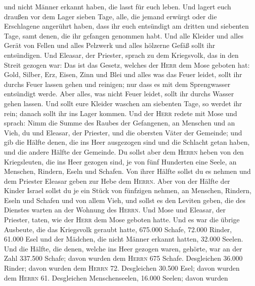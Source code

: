 und nicht Männer erkannt haben, die lasst für euch leben.
 Und lagert euch draußen vor dem Lager sieben Tage, alle,
die jemand erwürgt oder die Erschlagene angerührt haben, dass ihr euch
entsündigt am dritten und siebenten Tage, samt denen, die ihr gefangen
genommen habt.  Und alle Kleider und alles Gerät von
Fellen und alles Pelzwerk und alles hölzerne Gefäß sollt ihr
entsündigen.  Und Eleasar, der Priester, sprach zu dem
Kriegsvolk, das in den Streit gezogen war: Das ist das Gesetz, welches
der \textsc{Herr} dem Mose geboten hat:  Gold, Silber,
Erz, Eisen, Zinn und Blei  und alles was das Feuer
leidet, sollt ihr durchs Feuer lassen gehen und reinigen; nur dass es
mit dem Sprengwasser entsündigt werde. Aber alles, was nicht Feuer
leidet, sollt ihr durchs Wasser gehen lassen.  Und sollt
eure Kleider waschen am siebenten Tage, so werdet ihr rein; danach sollt
ihr ins Lager kommen.  Und der \textsc{Herr} redete mit
Mose und sprach:  Nimm die Summe des Raubes der
Gefangenen, an Menschen und an Vieh, du und Eleasar, der Priester, und
die obersten Väter der Gemeinde;  und gib die Hälfte
denen, die ins Heer ausgezogen sind und die Schlacht getan haben, und
die andere Hälfte der Gemeinde.  Du sollst aber dem
\textsc{Herrn} heben von den Kriegsleuten, die ins Heer gezogen sind, je
von fünf Hunderten eine Seele, an Menschen, Rindern, Eseln und Schafen.
 Von ihrer Hälfte sollst du es nehmen und dem Priester
Eleasar geben zur Hebe dem \textsc{Herrn}.  Aber von der
Hälfte der Kinder Israel sollst du je ein Stück von fünfzigen nehmen, an
Menschen, Rindern, Eseln und Schafen und von allem Vieh, und sollst es
den Leviten geben, die des Dienstes warten an der Wohnung des
\textsc{Herrn}.  Und Mose und Eleasar, der Priester,
taten, wie der \textsc{Herr} dem Mose geboten hatte.  Und
es war die übrige Ausbeute, die das Kriegsvolk geraubt hatte, 675.000
Schafe,  72.000 Rinder,  61.000 Esel
 und der Mädchen, die nicht Männer erkannt hatten, 32.000
Seelen.  Und die Hälfte, die denen, welche ins Heer
gezogen waren, gehörte, war an der Zahl 337.500 Schafe; 
davon wurden dem \textsc{Herrn} 675 Schafe.  Desgleichen
36.000 Rinder; davon wurden dem \textsc{Herrn} 72. 
Desgleichen 30.500 Esel; davon wurden dem \textsc{Herrn} 61.
 Desgleichen Menschenseelen, 16.000 Seelen; davon wurden
